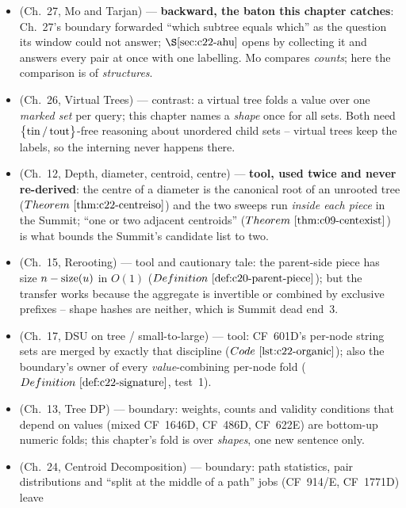 \begin{itemize}[nosep, leftmargin=1.4em]
  \item {} (Ch.~27, Mo and Tarjan) --- \textbf{backward, the baton this chapter
        catches}: Ch.~27's boundary forwarded ``which subtree equals which'' as the question
        its window could not answer; \(\secref{c22-ahu}\) opens by collecting it and answers
        every pair at once with one labelling. Mo compares \emph{counts}; here the
        comparison is of \emph{structures}.
  \item {} (Ch.~26, Virtual Trees) --- contrast: a virtual tree folds a value over
        one \emph{marked set} per query; this chapter names a \emph{shape} once for all sets.
        Both need \(\bigl\{\operatorname{tin}/\operatorname{tout}\bigr\}\)-free reasoning about unordered child sets --
        virtual trees keep the labels, so the interning never happens there.
  \item {} (Ch.~12, Depth, diameter, centroid, centre) --- \textbf{tool, used
        twice and never re-derived}: the centre of a diameter is the canonical root of an
        unrooted tree (\(\thmref{c22-centreiso}\)) and the two sweeps run \emph{inside each
        piece} in the Summit; ``one or two adjacent centroids'' (\(\thmref{c09-centexist}\))
        is what bounds the Summit's candidate list to two.
  \item {} (Ch.~15, Rerooting) --- tool and cautionary tale: the parent-side piece
        has size \(n-\operatorname{size}(u)\) in \(O(1)\) (\(\defref{c20-parent-piece}\)); but the
        transfer works because the aggregate is invertible or combined by exclusive
        prefixes -- shape hashes are neither, which is Summit dead end~3.
  \item {} (Ch.~17, DSU on tree / small-to-large) --- tool: CF~601D's per-node
        string sets are merged by exactly that discipline (\(\coderef{c22-organic}\)); also
        the boundary's owner of every \emph{value}-combining per-node fold
        (\(\defref{c22-signature}\), test~1).
  \item {} (Ch.~13, Tree DP) --- boundary: weights, counts and validity conditions
        that depend on values (mixed CF~1646D, CF~486D, CF~622E) are bottom-up numeric
        folds; this chapter's fold is over \emph{shapes}, one new sentence only.
  \item {} (Ch.~24, Centroid Decomposition) --- boundary: path statistics, pair
        distributions and ``split at the middle of a path'' jobs (CF~914/E, CF~1771D) leave

\end{itemize}
